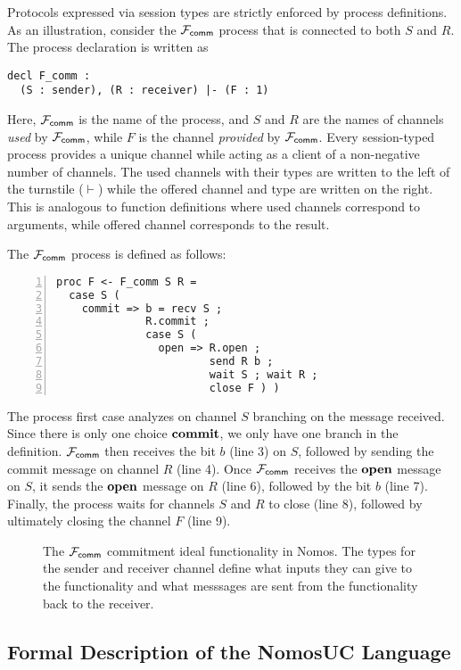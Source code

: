 Protocols expressed via session types are strictly enforced by
process definitions.
As an illustration, consider the $\mathcal{F}_{{\mathsf {comm}}}$ process that is connected
to both $S$ and $R$.
The process declaration is written as
\begin{lstlisting}[basicstyle=\small\ttfamily]
decl F_comm :
  (S : sender), (R : receiver) |- (F : 1)
\end{lstlisting}
Here, $\mathcal{F}_{{\mathsf {comm}}}$ is the name of the process, and $S$ and $R$ are the names
of channels \emph{used} by $\mathcal{F}_{{\mathsf {comm}}}$, while $F$ is the channel \emph{provided}
by $\mathcal{F}_{{\mathsf {comm}}}$.
Every session-typed process provides a unique channel while acting as a client
of a non-negative number of channels.
The used channels with their types are written to the left of the turnstile
($\vdash$) while the offered channel and type are written on the right.
This is analogous to function definitions where used channels correspond to
arguments, while offered channel corresponds to the result.

The $\mathcal{F}_{{\mathsf {comm}}}$ process is defined as follows:
\begin{lstlisting}[basicstyle=\small\ttfamily, numbers=left,xleftmargin=2em]
proc F <- F_comm S R =
  case S (
    commit => b = recv S ;
              R.commit ;
              case S (
                open => R.open ;
                        send R b ;
                        wait S ; wait R ;
                        close F ) )
\end{lstlisting}
The process first case analyzes on channel $S$ branching on the
message received.
Since there is only one choice $\mathbf{commit}$, we only have one
branch in the definition.
$\mathcal{F}_{{\mathsf {comm}}}$ then receives the bit $b$ (line 3) on $S$, followed by sending the
commit message on channel $R$ (line 4).
Once $\mathcal{F}_{{\mathsf {comm}}}$ receives the $\mathbf{open}$ message on $S$, it sends the
$\mathbf{open}$ message on $R$ (line 6), followed by the bit $b$ (line 7).
Finally, the process waits for channels $S$ and $R$ to close (line 8),
followed by ultimately closing the channel $F$ (line 9).

\begin{figure*}[!ht]

\caption{The $\mathcal{F}_{{\mathsf {comm}}}$ commitment ideal functionality in Nomos. The types for the sender and receiver channel define what inputs they can give to the functionality and what messsages are sent from the functionality back to the receiver.}
\label{fig:nomos:commitment}
\end{figure*}

\subsection{Formal Description of the NomosUC Language}


